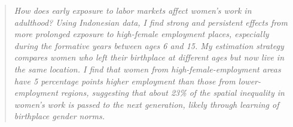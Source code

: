 \renewcommand{\abstractname}{}
\begin{abstract}
\noindent \itshape How does early exposure to labor markets affect women's work in adulthood? Using Indonesian data, I find strong and persistent effects from more prolonged exposure to high-female employment places, especially during the formative years between ages 6 and 15. My estimation strategy compares women who left their birthplace at different ages but now live in the same location. I find that women from high-female-employment areas have 5 percentage points higher employment than those from lower-employment regions, suggesting that about 23\% of the spatial inequality in women's work is passed to the next generation, likely through learning of birthplace gender norms. \vspace{2cm}
\end{abstract}
